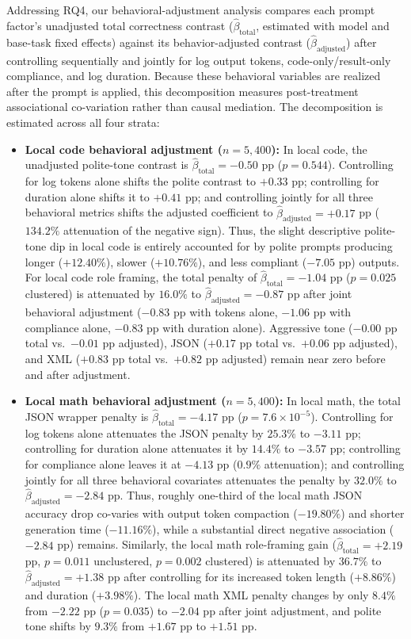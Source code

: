 \documentclass[a4paper,fleqn]{cas-sc}
\providecommand{\tightlist}{%
  \setlength{\itemsep}{0pt}\setlength{\parskip}{0pt}}
\begin{document}
Addressing RQ4, our behavioral-adjustment analysis compares each prompt factor's unadjusted total correctness contrast ($\hat{\beta}_{\text{total}}$, estimated with model and base-task fixed effects) against its behavior-adjusted contrast ($\hat{\beta}_{\text{adjusted}}$) after controlling sequentially and jointly for log output tokens, code-only/result-only compliance, and log duration. Because these behavioral variables are realized after the prompt is applied, this decomposition measures post-treatment associational co-variation rather than causal mediation. The decomposition is estimated across all four strata:
\begin{itemize}
\tightlist
\item \textbf{Local code behavioral adjustment ($n = 5,400$):} In local code, the unadjusted polite-tone contrast is $\hat{\beta}_{\text{total}} = -0.50$ pp ($p = 0.544$). Controlling for log tokens alone shifts the polite contrast to $+0.33$ pp; controlling for duration alone shifts it to $+0.41$ pp; and controlling jointly for all three behavioral metrics shifts the adjusted coefficient to $\hat{\beta}_{\text{adjusted}} = +0.17$ pp ($134.2\%$ attenuation of the negative sign). Thus, the slight descriptive polite-tone dip in local code is entirely accounted for by polite prompts producing longer ($+12.40\%$), slower ($+10.76\%$), and less compliant ($-7.05$ pp) outputs. For local code role framing, the total penalty of $\hat{\beta}_{\text{total}} = -1.04$ pp ($p = 0.025$ clustered) is attenuated by $16.0\%$ to $\hat{\beta}_{\text{adjusted}} = -0.87$ pp after joint behavioral adjustment ($-0.83$ pp with tokens alone, $-1.06$ pp with compliance alone, $-0.83$ pp with duration alone). Aggressive tone ($-0.00$ pp total vs.\ $-0.01$ pp adjusted), JSON ($+0.17$ pp total vs.\ $+0.06$ pp adjusted), and XML ($+0.83$ pp total vs.\ $+0.82$ pp adjusted) remain near zero before and after adjustment.
\item \textbf{Local math behavioral adjustment ($n = 5,400$):} In local math, the total JSON wrapper penalty is $\hat{\beta}_{\text{total}} = -4.17$ pp ($p = 7.6 \times 10^{-5}$). Controlling for log tokens alone attenuates the JSON penalty by $25.3\%$ to $-3.11$ pp; controlling for duration alone attenuates it by $14.4\%$ to $-3.57$ pp; controlling for compliance alone leaves it at $-4.13$ pp ($0.9\%$ attenuation); and controlling jointly for all three behavioral covariates attenuates the penalty by $32.0\%$ to $\hat{\beta}_{\text{adjusted}} = -2.84$ pp. Thus, roughly one-third of the local math JSON accuracy drop co-varies with output token compaction ($-19.80\%$) and shorter generation time ($-11.16\%$), while a substantial direct negative association ($-2.84$ pp) remains. Similarly, the local math role-framing gain ($\hat{\beta}_{\text{total}} = +2.19$ pp, $p = 0.011$ unclustered, $p = 0.002$ clustered) is attenuated by $36.7\%$ to $\hat{\beta}_{\text{adjusted}} = +1.38$ pp after controlling for its increased token length ($+8.86\%$) and duration ($+3.98\%$). The local math XML penalty changes by only $8.4\%$ from $-2.22$ pp ($p = 0.035$) to $-2.04$ pp after joint adjustment, and polite tone shifts by $9.3\%$ from $+1.67$ pp to $+1.51$ pp.

\end{itemize}
\end{document}
